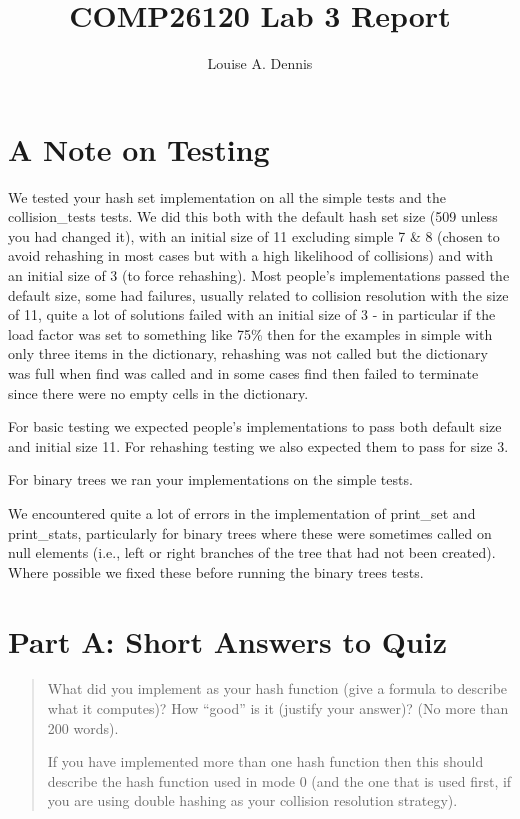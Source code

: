 \documentclass[a4]{article}
\title{COMP26120 Lab 3 Report}
\author{Louise A. Dennis}
\begin{document}
\maketitle

\section{A Note on Testing}

We tested your hash set implementation on all the simple tests and the collision\_tests tests.  We did this both with the default hash set size (509 unless you had changed it), with an initial size of 11 excluding simple 7 \& 8 (chosen to avoid rehashing in most cases but with a high likelihood of collisions) and with an initial size of 3 (to force rehashing).  Most people's implementations passed the default size, some had failures, usually related to collision resolution with the size of 11, quite a lot of solutions failed with an initial size of 3 - in particular if the load factor was set to something like 75\% then for the examples in simple with only three items in the dictionary, rehashing was not called but the dictionary was full when find was called and in some cases find then failed to terminate since there were no empty cells in the dictionary.

For basic testing we expected people's implementations to pass both default size and initial size 11.  For rehashing testing we also expected them to pass for size 3.

For binary trees we ran your implementations on the simple tests.

We encountered quite a lot of errors in the implementation of print\_set and print\_stats, particularly for binary trees where these were sometimes called on null elements (i.e., left or right branches of the tree that had not been created).  Where possible we fixed these before running the binary trees tests.  

\section{Part A: Short Answers to Quiz}

\begin{quote}
What did you implement as your hash function (give a formula to describe what it computes)? How “good” is it (justify your answer)? (No more than 200 words).  

If you have implemented more than one hash function then this should describe the hash function used in mode 0 (and the one that is used first, if you are using double hashing as your collision resolution strategy). 
\end{quote}
\end{document}
